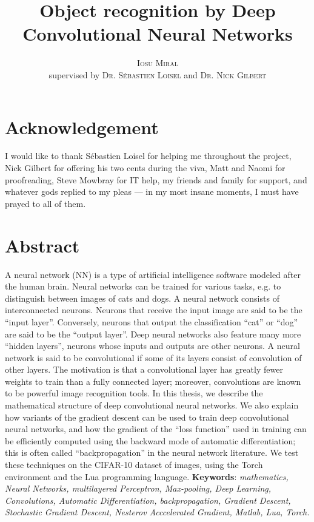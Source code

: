 \documentclass[titlepage]{article}
\title{{ Object recognition by Deep Convolutional Neural Networks}}
\author{\textsc{Iosu Miral}
			\\
			supervised by
			\textsc{Dr. S\'{e}bastien Loisel}
			and
			\textsc{Dr. Nick Gilbert}
		}
\date{\today
	\vfill
		\epigraph{Forget artificial intelligence - in the brave new world of big data, it's artificial idiocy we should be looking out for.}{Tom Chatfield \cite{Chatfield}}
	}
\theoremstyle{plain}
\theoremstyle{definition}
\begin{document}
	\maketitle

	\setcounter{page}{-2}
	\section*{Acknowledgement}
	
	I would like to thank S\'{e}bastien Loisel for helping me throughout the project, Nick Gilbert for offering his two cents during the viva, Matt and Naomi for proofreading, Steve Mowbray for IT help, my friends and family for support, and whatever gods replied to my pleas --- in my most insane moments, I must have prayed to all of them.
	\thispagestyle{empty}\newpage
	\section*{Abstract}
	
	A neural network (NN) is a type of artificial intelligence software modeled after the human brain. Neural networks can be trained for various tasks, e.g. to distinguish between images of cats and dogs. A neural network consists of interconnected neurons. Neurons that receive the input image are said to be the ``input layer''. Conversely, neurons that output the classification ``cat'' or ``dog'' are said to be the ``output layer''. Deep neural networks also feature many more ``hidden layers'', neurons whose inputs and outputs are other neurons. A neural network is said to be convolutional if some of its layers consist of convolution of other layers. The motivation is that a convolutional layer has greatly fewer weights to train than a fully connected layer; moreover, convolutions are known to be powerful image recognition tools. In this thesis, we describe the mathematical structure of deep convolutional neural networks. We also explain how variants of the gradient descent can be used to train deep convolutional neural networks, and how the gradient of the ``loss function'' used in training can be efficiently computed using the backward mode of automatic differentiation; this is often called ``backpropagation'' in the neural network literature. We test these techniques on the CIFAR-10 dataset of images, using the Torch environment and the Lua programming language.
	\vfill
	{\small \textbf{Keywords}: \textit{mathematics, Neural Networks, multilayered Perceptron, Max-pooling, Deep Learning, Convolutions, Automatic Differentiation, backpropagation, Gradient Descent, Stochastic Gradient Descent, Nesterov Acccelerated Gradient, Matlab, Lua, Torch.}}
	
\end{document}
